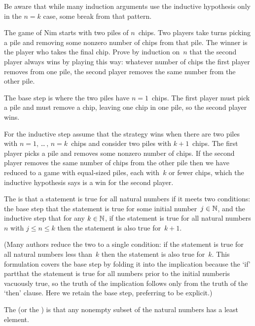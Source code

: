 \documentclass{ibl}
\begin{document}
\noindent
Be aware that while many induction arguments use the inductive 
hypothesis only in the $n=k$ case,
some break from that pattern.

\begin{ex}
The game of Nim starts with two piles of $n$~chips.
Two players take turns picking a pile and removing 
some nonzero number of chips from that pile. 
The winner is the player who takes the final chip.
Prove by induction on~$n$ that the second player always wins by
playing this way: whatever number of chips the first player removes
from one pile, the second player removes the same number from the other pile.
\begin{ans}
The base step is where the two piles have $n=1$~chips.
The first player must pick a pile and must remove a chip, leaving one chip
in one pile, so the second player wins.

For the inductive step assume that the strategy wins when there are two piles
with $n=1$, \ldots\,, $n=k$~chips and consider two piles with
$k+1$~chips.
The first player picks a pile and removes some nonzero number of chips.
If the second player removes the same number of chips from the other
pile then we have reduced to a game with equal-sized piles, each
with~$k$ or fewer chips, which the inductive hypothesis says
is a win for the second player.  
\end{ans}
\end{ex}

\begin{df}
The  is that a
statement is true for all natural numbers if it
meets two conditions: the base step that the statement is true for some
initial number~$j\in\mathbb{N}$,
and the inductive step that for any $k\in\mathbb{N}$, 
if the statement is true for 
all natural numbers $n$ with $j\leq n\leq k$ then the
statement is also true for~$k+1$.  
\end{df}

\noindent (Many authors reduce the two to a single condition: 
if the statement is true for all natural numbers less than~$k$
then the statement is also true for~$k$.
This formulation covers the base step by folding it into the 
implication because
the `if' part\Dash that the statement is true for all numbers prior to
the initial number\Dash is vacuously true, so the truth of the implication
follows only from the truth of the `then' clause.
Here we retain the base step, preferring to be explicit.)

\begin{df}
The  
(or the )
is that any nonempty 
subset of the natural
numbers has a least element.  
\end{df}
\end{document}
